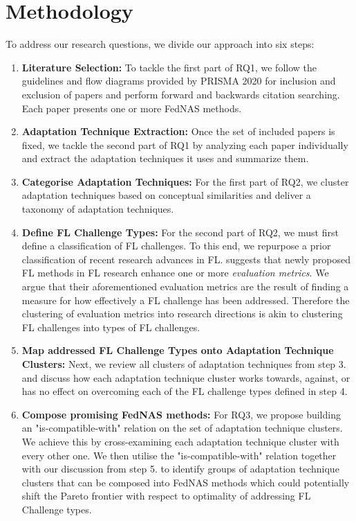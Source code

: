 \section{Methodology}

To address our research questions, we divide our approach into six steps:

\begin{enumerate}
    \item \textbf{Literature Selection:} To tackle the first part of RQ1, we follow the guidelines and flow diagrams provided by PRISMA 2020 \cite{prisma_2020} for inclusion and exclusion of papers and perform forward and backwards citation searching. Each paper presents one or more FedNAS methods. 
    \item \textbf{Adaptation Technique Extraction:} Once the set of included papers is fixed, we tackle the second part of RQ1 by analyzing each paper individually and extract the adaptation techniques it uses and summarize them.
    \item \textbf{Categorise Adaptation Techniques:} For the first part of RQ2, we cluster adaptation techniques based on conceptual similarities and deliver a taxonomy of adaptation techniques.
    \item \textbf{Define FL Challenge Types:} For the second part of RQ2, we must first define a classification of FL challenges. To this end, we repurpose a prior classification \cite{fl_taxonomy_2024} of recent research advances in FL. \cite{fl_taxonomy_2024} suggests that newly proposed FL methods in FL research enhance one or more \textit{evaluation metrics}. We argue that their aforementioned evaluation metrics are the result of finding a measure for how effectively a FL challenge has been addressed. Therefore the clustering of evaluation metrics into research directions is akin to clustering FL challenges into types of FL challenges.
    \item \textbf{Map addressed FL Challenge Types onto Adaptation Technique Clusters:} Next, we review all clusters of adaptation techniques from step 3. and discuss how each adaptation technique cluster works towards, against, or has no effect on overcoming each of the FL challenge types defined in step 4.
    \item \textbf{Compose promising FedNAS methods:} For RQ3, we propose building an "is-compatible-with" relation on the set of adaptation technique clusters. We achieve this by cross-examining each adaptation technique cluster with every other one. We then utilise the "is-compatible-with" relation together with our discussion from step 5. to identify groups of adaptation technique clusters that can be composed into FedNAS methods which could potentially shift the Pareto frontier with respect to optimality of addressing FL Challenge types.
\end{enumerate}